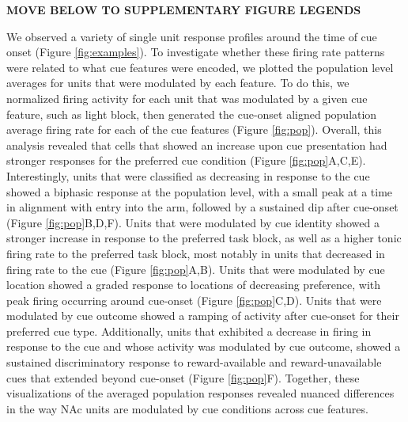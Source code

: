 \documentclass[11pt]{article}
\begin{document}
{\bf MOVE BELOW TO SUPPLEMENTARY FIGURE LEGENDS}

We observed a variety of single unit response profiles around the time
of cue onset (Figure \ref{fig:examples}). To investigate whether these
firing rate patterns were related to what cue features were encoded,
we plotted the population level averages for units that were modulated
by each feature. To do this, we normalized firing activity for each
unit that was modulated by a given cue feature, such as light block,
then generated the cue-onset aligned population average firing rate
for each of the cue features (Figure \ref{fig:pop}). Overall, this
analysis revealed that cells that showed an increase upon cue
presentation had stronger responses for the preferred cue condition
(Figure \ref{fig:pop}A,C,E). Interestingly, units that were classified
as decreasing in response to the cue showed a biphasic response at the
population level, with a small peak at a time in alignment with entry
into the arm, followed by a sustained dip after cue-onset (Figure
\ref{fig:pop}B,D,F). Units that were modulated by cue identity showed
a stronger increase in response to the preferred task block, as well
as a higher tonic firing rate to the preferred task block, most
notably in units that decreased in firing rate to the cue (Figure
\ref{fig:pop}A,B). Units that were modulated by cue location showed a
graded response to locations of decreasing preference, with peak
firing occurring around cue-onset (Figure \ref{fig:pop}C,D). Units
that were modulated by cue outcome showed a ramping of activity after
cue-onset for their preferred cue type. Additionally, units that
exhibited a decrease in firing in response to the cue and whose
activity was modulated by cue outcome, showed a sustained
discriminatory response to reward-available and reward-unavailable
cues that extended beyond cue-onset (Figure \ref{fig:pop}F). Together,
these visualizations of the averaged population responses revealed
nuanced differences in the way NAc units are modulated by cue
conditions across cue features.
\end{document}
